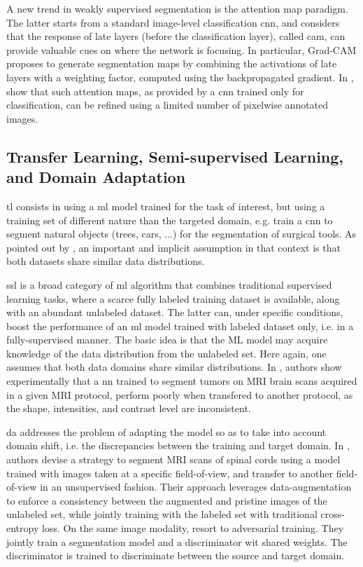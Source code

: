 A new trend in weakly supervised segmentation is the attention map paradigm.
The latter starts from a standard image-level classification \gls{cnn}, and considers that the response of late layers (before the classification layer), called \gls{cam}, can provide valuable cues on where the network is focusing.
In particular, Grad-CAM \cite{selvaraju17} proposes to generate segmentation maps by combining the activations of late layers with a weighting factor, computed using the backpropagated gradient.
In \cite{li18}, show that such attention maps, as provided by a \gls{cnn} trained only for classification, can be refined using a limited number of pixelwise annotated images.


\subsection{Transfer Learning, Semi-supervised Learning, and Domain Adaptation}
\gls{tl} consists in using a \gls{ml} model trained for the task of interest, but using a training set of different nature than the targeted domain, e.g. train a \gls{cnn} to segment natural objects (trees, cars, ...) for the segmentation of surgical tools.
As pointed out by \cite{oliver18}, an important and implicit assumption in that context is that both datasets share similar data distributions.

\gls{ssl} is a broad category of \gls{ml} algorithm that combines traditional supervised learning tasks, where a scarce fully labeled training dataset is available, along with an abundant unlabeled dataset.
The latter can, under specific conditions, boost the performance of an \gls{ml} model trained with labeled dataset only, i.e. in a fully-supervised manner.
The basic idea is that the ML model may acquire knowledge of the data distribution from the unlabeled set.
Here again, one assumes that both data domains share similar distributions.
In \cite{ghafoorian17}, authors show experimentally that a \gls{nn} trained to segment tumors on MRI brain scans acquired in a given MRI protocol, perform poorly when transfered to another protocol, as the shape, intensities, and contrast level are inconsistent.

\gls{da} addresses the problem of adapting the model so as to take into account domain shift, i.e. the discrepancies between the training and target domain.
In \cite{perone19}, authors devise a strategy to segment MRI scans of spinal cords using a model trained with images taken at a specific field-of-view, and transfer to another field-of-view in an unsupervised fashion.
Their approach leverages data-augmentation to enforce a consistency between the augmented and pristine images of the unlabeled set, while jointly training with the labeled set with traditional cross-entropy loss.
On the same image modality, \cite{li20} resort to adversarial training. They jointly train a segmentation model and a discriminator wit shared weights. The discriminator is trained to discriminate between the source and target domain.

